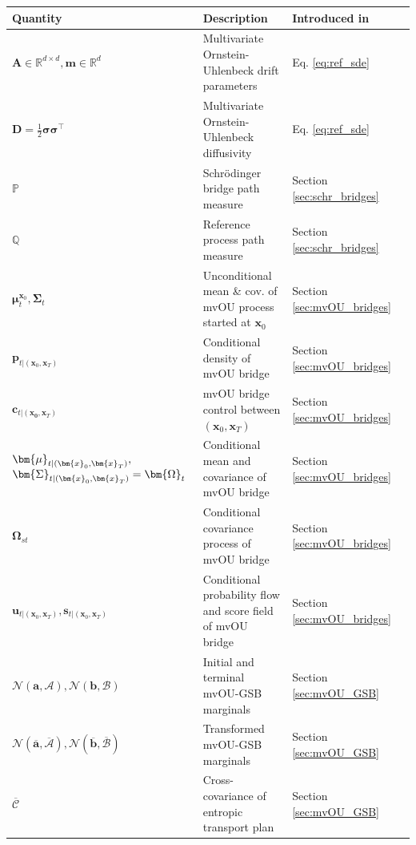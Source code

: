 \documentclass{article}
\newcommand{\Nc}{\mathcal{N}}
\newcommand{\Ac}{\mathcal{A}}
\newcommand{\Bc}{\mathcal{B}}
\newcommand{\Cc}{\mathcal{C}}
\theoremstyle{newstyle}
\begin{document}
\begin{table}[h]
  \centering
  \small
  \begin{tabular}{llll}
    \toprule 
    \textbf{Quantity} & \textbf{Description} & \textbf{Introduced in} \\
    \midrule
    $\bm{A} \in \mathbb{R}^{d \times d}, \bm{m} \in \mathbb{R}^d$  & Multivariate Ornstein-Uhlenbeck drift parameters & Eq. \eqref{eq:ref_sde} \\
    $\bm{D} = \frac{1}{2} \bm{\sigma}\bm{\sigma}^\top$ & Multivariate Ornstein-Uhlenbeck diffusivity & Eq. \eqref{eq:ref_sde} \\ 
    $\mathbb{P}$ & Schr\"odinger bridge path measure & Section \ref{sec:schr_bridges}  \\ 
    $\mathbb{Q}$ & Reference process path measure & Section \ref{sec:schr_bridges}  \\
    $\bm{\mu}_t^{\bm{x}_0}, \bm{\Sigma}_t$ & Unconditional mean \& cov. of mvOU process started at $\bm{x}_0$ & Section \ref{sec:mvOU_bridges} \\ 
    $\bm{p}_{t | (\bm{x}_0, \bm{x}_T)}$ & Conditional density of mvOU bridge & Section \ref{sec:mvOU_bridges} \\
    $\bm{c}_{t | (\bm{x_0}, \bm{x}_T)}$ & mvOU bridge control between $(\bm{x}_0, \bm{x}_T)$ & Section \ref{sec:mvOU_bridges} \\
    $\hspace{-0.5em}\begin{array}{l}\bm{\mu}_{t | (\bm{x}_0, \bm{x}_T)}, \\\bm{\Sigma}_{t | (\bm{x}_0, \bm{x}_T)} = \bm{\Omega}_t \end{array}$ & Conditional mean and covariance of mvOU bridge & Section \ref{sec:mvOU_bridges} \\
    $\bm{\Omega}_{st}$ & Conditional covariance process of mvOU bridge & Section \ref{sec:mvOU_bridges} \\ 
    $\bm{u}_{t | (\bm{x}_0, \bm{x}_T)}, \bm{s}_{t | (\bm{x}_0, \bm{x}_T)}$ & Conditional probability flow and score field of mvOU bridge & Section \ref{sec:mvOU_bridges} \\
    $\Nc(\bm{a}, \bm{\Ac}), \Nc(\bm{b}, \bm{\Bc})$ & Initial and terminal mvOU-GSB marginals & Section \ref{sec:mvOU_GSB} \\ 
    $\Nc(\overline{\bm{a}}, \overline{\bm{\Ac}}), \Nc(\overline{\bm{b}}, \overline{\bm{\Bc}})$ & Transformed mvOU-GSB marginals & Section \ref{sec:mvOU_GSB} \\
    $\overline{\bm{\Cc}}$ & Cross-covariance of entropic transport plan & Section \ref{sec:mvOU_GSB} \\

\end{tabular}
\end{table}
\end{document}
